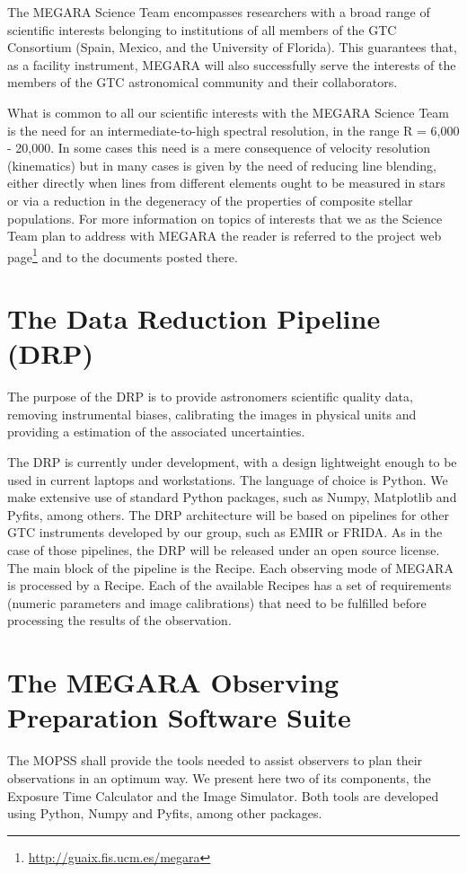 The MEGARA Science Team encompasses researchers with a broad range of scientific interests belonging to institutions of all members of the GTC Consortium (Spain, Mexico, and the University of Florida). This guarantees that, as a facility instrument, MEGARA will also successfully serve the interests of the members of the GTC astronomical community and their collaborators.

What is common to all our scientific interests with the MEGARA Science Team is the need for an intermediate-to-high spectral resolution, in the range R = 6,000 - 20,000. In some cases this need is a mere consequence of velocity resolution (kinematics) but in many cases is given by the need of reducing line blending, either directly when lines from different elements ought to be measured in stars or via a reduction in the degeneracy of the properties of composite stellar populations. For more information on topics of interests that we as the Science Team plan to address with MEGARA the reader is referred to the project web page\footnote{\url{http://guaix.fis.ucm.es/megara}} and to the documents posted there.

\section{The Data Reduction Pipeline (DRP)}
The purpose of the DRP is to provide astronomers scientific quality data,  removing instrumental biases, calibrating the images in physical units and providing a estimation of the associated uncertainties.

The DRP is currently under development, with a design lightweight enough to be used in current laptops and workstations. The language of choice is Python. We make extensive use of standard Python packages, such as Numpy, Matplotlib and Pyfits, among others. The DRP architecture will be based on pipelines for other GTC instruments developed by our group, such as EMIR or FRIDA. As in the case of those pipelines, the DRP will be released under an open source license. The main block of the pipeline is the Recipe. Each observing mode of MEGARA is processed by a Recipe. Each of the available Recipes has a set of requirements (numeric parameters and image calibrations) that need to be fulfilled before processing the results of the observation. 

\section{The MEGARA Observing Preparation Software Suite}
The MOPSS shall provide the tools needed to assist observers to plan their observations in an optimum way. We present here two of its components, the Exposure Time Calculator and the Image Simulator. Both tools are developed using Python, Numpy and Pyfits, among other packages.

